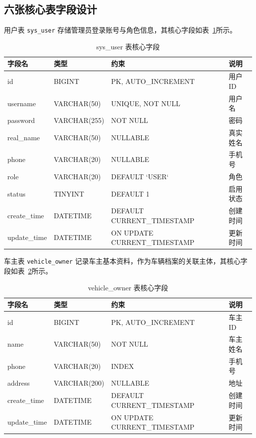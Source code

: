 \documentclass{wzuthesis} %
\begin{document}
\subsection{六张核心表字段设计}

用户表 \texttt{sys\_user} 存储管理员登录账号与角色信息，其核心字段如表~\ref{tab:ddl-sys-user}所示。

\begin{table}[H]
\centering
\footnotesize
\caption{sys\_user 表核心字段}
\label{tab:ddl-sys-user}
\begin{tabular}{|p{2.2cm}|p{2.2cm}|p{4.0cm}|p{4.5cm}|}
\hline
字段名 & 类型 & 约束 & 说明 \\
\hline
id & BIGINT & PK, AUTO\_INCREMENT & 用户 ID \\
\hline
username & VARCHAR(50) & UNIQUE, NOT NULL & 用户名 \\
\hline
password & VARCHAR(255) & NOT NULL & 密码 \\
\hline
real\_name & VARCHAR(50) & NULLABLE & 真实姓名 \\
\hline
phone & VARCHAR(20) & NULLABLE & 手机号 \\
\hline
role & VARCHAR(20) & DEFAULT `USER` & 角色 \\
\hline
status & TINYINT & DEFAULT 1 & 启用状态 \\
\hline
create\_time & DATETIME & DEFAULT CURRENT\_TIMESTAMP & 创建时间 \\
\hline
update\_time & DATETIME & ON UPDATE CURRENT\_TIMESTAMP & 更新时间 \\
\hline
\end{tabular}
\end{table}

车主表 \texttt{vehicle\_owner} 记录车主基本资料，作为车辆档案的关联主体，其核心字段如表~\ref{tab:ddl-owner}所示。

\begin{table}[H]
\centering
\footnotesize
\caption{vehicle\_owner 表核心字段}
\label{tab:ddl-owner}
\begin{tabular}{|p{2.2cm}|p{2.2cm}|p{4.0cm}|p{4.5cm}|}
\hline
字段名 & 类型 & 约束 & 说明 \\
\hline
id & BIGINT & PK, AUTO\_INCREMENT & 车主 ID \\
\hline
name & VARCHAR(50) & NOT NULL & 车主姓名 \\
\hline
phone & VARCHAR(20) & INDEX & 手机号 \\
\hline
address & VARCHAR(200) & NULLABLE & 地址 \\
\hline
create\_time & DATETIME & DEFAULT CURRENT\_TIMESTAMP & 创建时间 \\
\hline
update\_time & DATETIME & ON UPDATE CURRENT\_TIMESTAMP & 更新时间 \\
\hline
\end{tabular}
\end{table}
\end{document}
